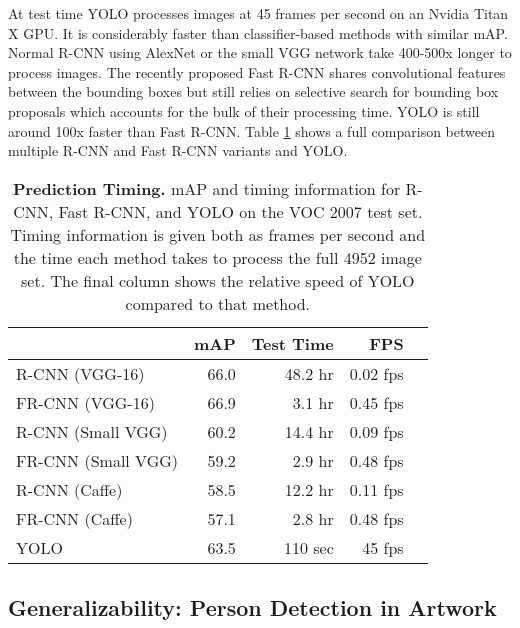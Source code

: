 At test time YOLO processes images at 45 frames per second on an Nvidia Titan X GPU. It is considerably faster than classifier-based methods with similar mAP. Normal R-CNN using AlexNet or the small VGG network take 400-500x longer to process images. The recently proposed Fast R-CNN shares convolutional features between the bounding boxes but still relies on selective search for bounding box proposals which accounts for the bulk of their processing time. YOLO is still around 100x faster than Fast R-CNN. Table \ref{timing} shows a full comparison between multiple R-CNN and Fast R-CNN variants and YOLO.

\begin{table}[h]
\begin{center}
\begin{tabular}{lrrrr}
 & mAP & Test Time & FPS\\
\hline
R-CNN (VGG-16) & 66.0 & 48.2 hr & 0.02 fps \\
FR-CNN (VGG-16) & 66.9 & 3.1 hr & 0.45 fps \\
R-CNN (Small VGG) & 60.2 & 14.4 hr & 0.09 fps \\
FR-CNN (Small VGG) & 59.2 & 2.9 hr & 0.48 fps \\
R-CNN (Caffe) & 58.5 & 12.2 hr & 0.11 fps \\
FR-CNN (Caffe) & 57.1 & 2.8 hr & 0.48 fps \\
YOLO & 63.5 & 110 sec & 45 fps \\
\end{tabular}
\end{center}
\caption{\small \textbf{Prediction Timing.} mAP and timing information for R-CNN, Fast R-CNN, and YOLO on the VOC 2007 test set. Timing information is given both as frames per second and the time each method takes to process the full 4952 image set. The final column shows the relative speed of YOLO compared to that method.}
\label{timing}
\end{table}
\fi

\subsection{Generalizability: Person Detection in Artwork}

